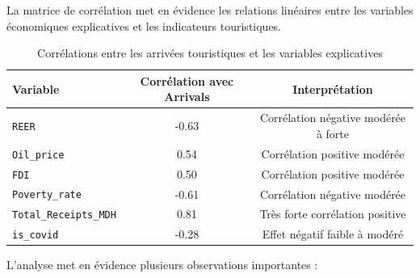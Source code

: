 \documentclass[12pt,a4paper]{report}
\begin{document}
La matrice de corrélation met en évidence les relations
linéaires entre les variables économiques explicatives et
les indicateurs touristiques.

\begin{table}[H]
\centering
\small
\renewcommand{\arraystretch}{1.4}
\begin{tabular}{lcc}
\toprule
\textbf{Variable} & \textbf{Corrélation avec Arrivals}
& \textbf{Interprétation} \\
\midrule
\texttt{REER} & -0.63 & Corrélation négative modérée à forte \\
\texttt{Oil\_price} & 0.54 & Corrélation positive modérée \\
\texttt{FDI} & 0.50 & Corrélation positive modérée \\
\texttt{Poverty\_rate} & -0.61 & Corrélation négative modérée \\
\texttt{Total\_Receipts\_MDH} & 0.81 & Très forte corrélation positive \\
\texttt{is\_covid} & -0.28 & Effet négatif faible à modéré \\
\bottomrule
\end{tabular}
\caption{Corrélations entre les arrivées touristiques et les variables explicatives}
\end{table}

L’analyse met en évidence plusieurs observations importantes :
\end{document}
